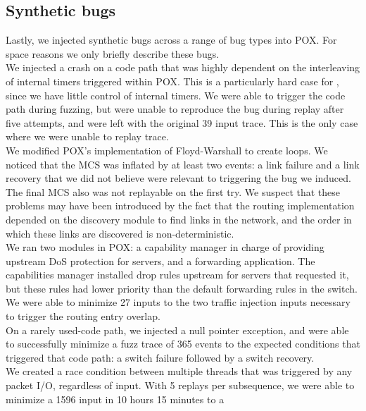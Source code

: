 \subsection{Synthetic bugs}
Lastly, we injected synthetic bugs across a range of bug types into POX. For space
reasons we only briefly describe these bugs.\\[0.5ex]
%
We injected a crash on a code path that was highly dependent on the
interleaving of internal timers triggered within POX. This is a particularly
hard case for \projectname, since we have little control of internal timers.
We were able to trigger the code path during fuzzing, but were unable to
reproduce the bug during replay after five attempts, and were left with the
original 39 input trace. This is the only case where we were
unable to replay trace.\\[0.5ex]
%
We modified POX's implementation of Floyd-Warshall to create loops.
We noticed that the MCS was inflated by at least two events: a link failure
and a link recovery that we did not believe were relevant to triggering the bug we
induced. The final MCS also was not replayable on the first try.
We suspect that these problems may have been introduced by the fact that the
routing implementation depended on the discovery module to find links in the
network, and the order in which these links are discovered is
non-deterministic.\\[0.5ex]
%
We ran two modules in POX: a capability manager in charge of providing
upstream DoS protection for servers, and a forwarding application. The
capabilities manager installed drop rules upstream for servers that requested
it, but these rules had lower priority than the default forwarding rules in
the switch. We were able to minimize 27 inputs to the two traffic injection
inputs necessary to trigger the routing entry overlap.\\[0.5ex]
%
On a rarely used-code path, we injected a null pointer exception,
and were able to successfully minimize a fuzz trace of 365 events to the
expected conditions that triggered that code path: a switch failure followed
by a switch recovery.\\[0.5ex]
%
We created a race condition between multiple threads that was
triggered by any packet I/O, regardless of input. With 5 replays per
subsequence, we were able to minimize a 1596 input in 10 hours 15 minutes to a
